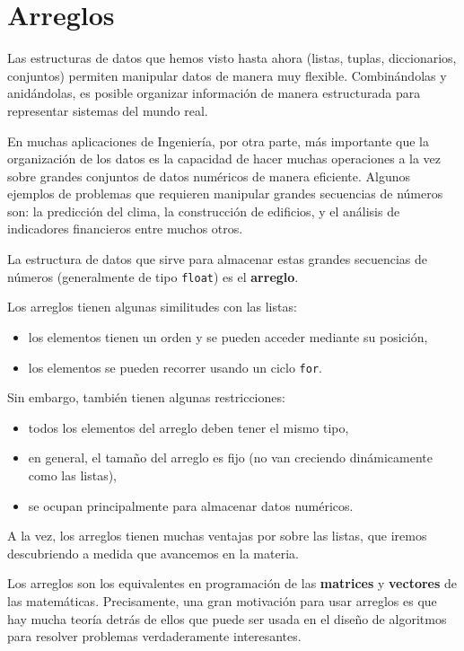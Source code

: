 \chapter{Arreglos}

Las estructuras de datos que hemos visto hasta ahora (listas, tuplas,
diccionarios, conjuntos) permiten manipular datos de manera muy
flexible. Combinándolas y anidándolas, es posible organizar información
de manera estructurada para representar sistemas del mundo real.

En muchas aplicaciones de Ingeniería, por otra parte, más importante que
la organización de los datos es la capacidad de hacer muchas operaciones
a la vez sobre grandes conjuntos de datos numéricos de manera eficiente.
Algunos ejemplos de problemas que requieren manipular grandes secuencias
de números son: la predicción del clima, la construcción de edificios, y
el análisis de indicadores financieros entre muchos otros.

La estructura de datos que sirve para almacenar estas grandes secuencias
de números (generalmente de tipo \lstinline!float!) es el
\textbf{arreglo}.

Los arreglos tienen algunas similitudes con las listas:

\begin{itemize}
\item
  los elementos tienen un orden y se pueden acceder mediante su
  posición,
\item
  los elementos se pueden recorrer usando un ciclo \lstinline!for!.
\end{itemize}

Sin embargo, también tienen algunas restricciones:

\begin{itemize}
\item
  todos los elementos del arreglo deben tener el mismo tipo,
\item
  en general, el tamaño del arreglo es fijo (no van creciendo
  dinámicamente como las listas),
\item
  se ocupan principalmente para almacenar datos numéricos.
\end{itemize}

A la vez, los arreglos tienen muchas ventajas por sobre las listas, que
iremos descubriendo a medida que avancemos en la materia.

Los arreglos son los equivalentes en programación de las
\textbf{matrices} y \textbf{vectores} de las matemáticas. Precisamente,
una gran motivación para usar arreglos es que hay mucha teoría detrás de
ellos que puede ser usada en el diseño de algoritmos para resolver
problemas verdaderamente interesantes.

